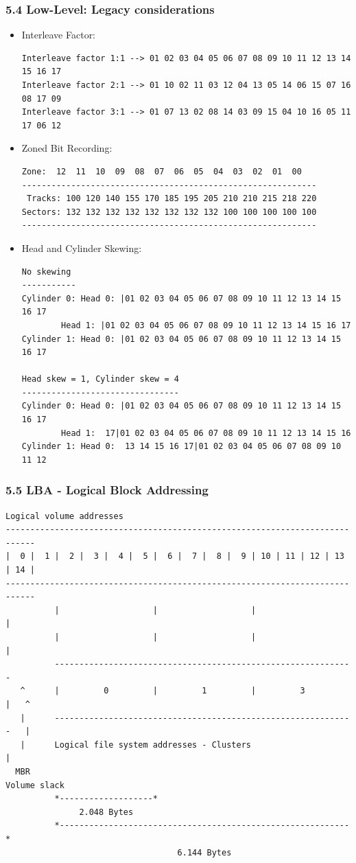 \begin{frame}[fragile]
  \frametitle{5.4 Low-Level: Legacy considerations}
    \begin{itemize}
        \item[] Interleave Factor:
\begin{lstlisting}[basicstyle=\tiny]
Interleave factor 1:1 --> 01 02 03 04 05 06 07 08 09 10 11 12 13 14 15 16 17 
Interleave factor 2:1 --> 01 10 02 11 03 12 04 13 05 14 06 15 07 16 08 17 09 
Interleave factor 3:1 --> 01 07 13 02 08 14 03 09 15 04 10 16 05 11 17 06 12
\end{lstlisting}
        \item[] Zoned Bit Recording:
\begin{lstlisting}[basicstyle=\tiny]
   Zone:  12  11  10  09  08  07  06  05  04  03  02  01  00
------------------------------------------------------------
 Tracks: 100 120 140 155 170 185 195 205 210 210 215 218 220
Sectors: 132 132 132 132 132 132 132 132 100 100 100 100 100
------------------------------------------------------------
\end{lstlisting}
        \item[] Head and Cylinder Skewing:
\begin{lstlisting}[basicstyle=\tiny]
No skewing
-----------
Cylinder 0: Head 0: |01 02 03 04 05 06 07 08 09 10 11 12 13 14 15 16 17
	    Head 1: |01 02 03 04 05 06 07 08 09 10 11 12 13 14 15 16 17
Cylinder 1: Head 0: |01 02 03 04 05 06 07 08 09 10 11 12 13 14 15 16 17

Head skew = 1, Cylinder skew = 4
--------------------------------
Cylinder 0: Head 0: |01 02 03 04 05 06 07 08 09 10 11 12 13 14 15 16 17
	    Head 1:  17|01 02 03 04 05 06 07 08 09 10 11 12 13 14 15 16
Cylinder 1: Head 0:  13 14 15 16 17|01 02 03 04 05 06 07 08 09 10 11 12
\end{lstlisting}
    \end{itemize}
\end{frame}


\begin{frame}[fragile]
  \frametitle{5.5 LBA - Logical Block Addressing}
  \begin{lstlisting}[basicstyle=\tiny\ttfamily]
Logical volume addresses
----------------------------------------------------------------------------
|  0 |  1 |  2 |  3 |  4 |  5 |  6 |  7 |  8 |  9 | 10 | 11 | 12 | 13 | 14 |
----------------------------------------------------------------------------
          |                   |                   |                   |
          |                   |                   |                   |
          -------------------------------------------------------------
   ^      |         0         |         1         |         3         |   ^
   |      -------------------------------------------------------------   |
   |      Logical file system addresses - Clusters                        |
  MBR                                                               Volume slack
          *-------------------*
               2.048 Bytes
          *-----------------------------------------------------------*
                                   6.144 Bytes
  \end{lstlisting}
\end{frame}


